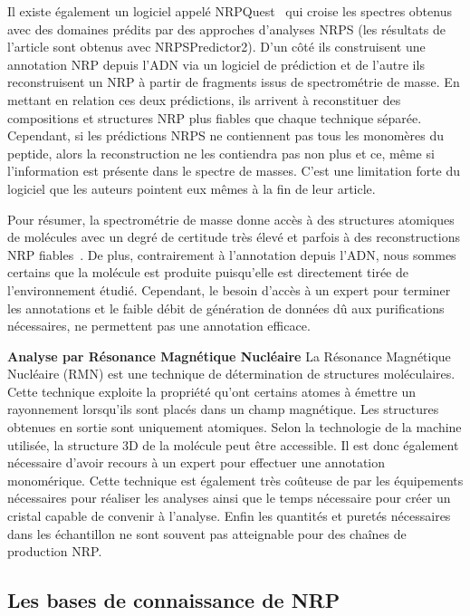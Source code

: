 Il existe également un logiciel appelé NRPQuest~\cite{mohimani_nrpquest:_2014} qui croise les spectres obtenus avec des domaines prédits par des approches d'analyses NRPS (les résultats de l'article sont obtenus avec NRPSPredictor2).
D'un côté ils construisent une annotation NRP depuis l'ADN via un logiciel de prédiction et de l'autre ils reconstruisent un NRP à partir de fragments issus de spectrométrie de masse.
En mettant en relation ces deux prédictions, ils arrivent à reconstituer des compositions et structures NRP plus fiables que chaque technique séparée.
Cependant, si les prédictions NRPS ne contiennent pas tous les monomères du peptide, alors la reconstruction ne les contiendra pas non plus et ce, même si l'information est présente dans le spectre de masses.
C'est une limitation forte du logiciel que les auteurs pointent eux mêmes à la fin de leur article.

Pour résumer, la spectrométrie de masse donne accès à des structures atomiques de molécules avec un degré de certitude très élevé et parfois à des reconstructions NRP fiables~\cite{mohimani_dereplication_2015}.
De plus, contrairement à l'annotation depuis l'ADN, nous sommes certains que la molécule est produite puisqu'elle est directement tirée de l'environnement étudié.
Cependant, le besoin d'accès à un expert pour terminer les annotations et le faible débit de génération de données dû aux purifications nécessaires, ne permettent pas une annotation efficace.


\textbf{Analyse par Résonance Magnétique Nucléaire}
La Résonance Magnétique Nucléaire (RMN) est une technique de détermination de structures moléculaires.
Cette technique exploite la propriété qu'ont certains atomes à émettre un rayonnement lorsqu'ils sont placés dans un champ magnétique.
Les structures obtenues en sortie sont uniquement atomiques.
Selon la technologie de la machine utilisée, la structure 3D de la molécule peut être accessible.
Il est donc également nécessaire d'avoir recours à un expert pour effectuer une annotation monomérique.
Cette technique est également très coûteuse de par les équipements nécessaires pour réaliser les analyses ainsi que le temps nécessaire pour créer un cristal capable de convenir à l'analyse.
Enfin les quantités et puretés nécessaires dans les échantillon ne sont souvent pas atteignable pour des chaînes de production NRP.



\subsection{Les bases de connaissance de NRP}

